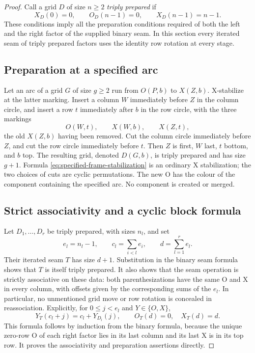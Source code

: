 \documentclass[11pt,a4paper]{article}
\theoremstyle{remark}
\begin{document}
\begin{proof}

Call a grid $D$ of size $n\geq2$ \emph{triply prepared} if
\begin{equation}\label{eq:triple-preparation}
 X_D(0)=0,\qquad O_D(n-1)=0,\qquad X_D(n-1)=n-1.
\end{equation}
These conditions imply all the preparation conditions required of both
the left and the right factor of the supplied binary seam.  In this
section every iterated seam of triply prepared factors uses the identity
row rotation at every stage.

\subsection{Preparation at a specified arc}

Let an arc of a grid $G$ of size $g\geq2$ run from $O(P,b)$ to
$X(Z,b)$.  X-stabilize at the latter marking.  Insert a column $W$
immediately before $Z$ in the column circle, and insert a row $t$
immediately after $b$ in the row circle, with the three markings
\begin{equation}\label{eq:specified-frame-stabilization}
 O(W,t),\qquad X(W,b),\qquad X(Z,t),
\end{equation}
the old $X(Z,b)$ having been removed.  Cut the column circle immediately
before $Z$, and cut the row circle immediately before $t$.  Then $Z$ is
first, $W$ last, $t$ bottom, and $b$ top.  The resulting grid, denoted
$D(G,b)$, is triply prepared and has size $g+1$.  Formula
\eqref{eq:specified-frame-stabilization} is an ordinary X stabilization;
the two choices of cuts are cyclic permutations.  The new O has the
colour of the component containing the specified arc.  No component is
created or merged.

\subsection{Strict associativity and a cyclic block formula}

Let $D_1,\ldots,D_r$ be triply prepared, with sizes $n_l$, and set
\[
 e_l=n_l-1,\qquad c_l=\sum_{i<l}e_i,\qquad d=\sum_{l=1}^r e_l.
\]
Their iterated seam $T$ has size $d+1$.  Substitution in the binary
seam formula shows that $T$ is itself triply prepared.  It also shows
that the seam operation is strictly associative on these data: both
parenthesizations have the same O and X in every column, with offsets
given by the corresponding sums of the $e_l$.  In particular, no
unmentioned grid move or row rotation is concealed in reassociation.
Explicitly, for $0\leq j<e_l$ and $Y\in\{O,X\}$,
\[
 Y_T(c_l+j)=c_l+Y_{D_l}(j),\qquad O_T(d)=0,\quad X_T(d)=d.
\]
This formula follows by induction from the binary formula, because
the unique zero-row O of each right factor lies in its last column
and its last X is in its top row.  It proves the associativity and
preparation assertions directly.


\end{proof}
\end{document}
